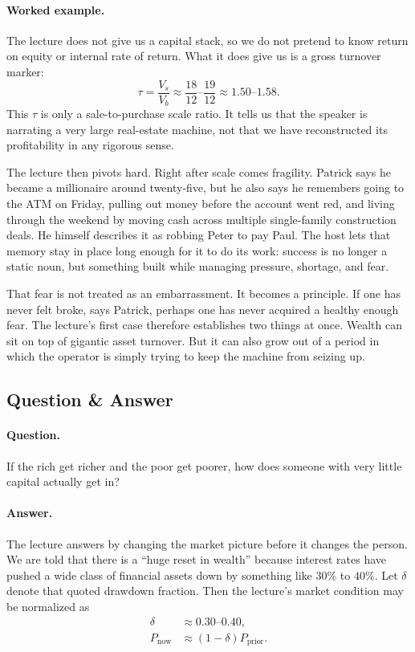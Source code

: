 \paragraph{Worked example.} The lecture does not give us a capital stack, so we do not pretend to know return on equity or internal rate of return. What it does give us is a gross turnover marker:
\begin{equation}
\tau = \frac{V_s}{V_b} \approx \frac{18}{12}\text{--}\frac{19}{12} \approx 1.50\text{--}1.58.
\end{equation}
This \(\tau\) is only a sale-to-purchase scale ratio. It tells us that the speaker is narrating a very large real-estate machine, not that we have reconstructed its profitability in any rigorous sense.

The lecture then pivots hard. Right after scale comes fragility. Patrick says he became a millionaire around twenty-five, but he also says he remembers going to the ATM on Friday, pulling out money before the account went red, and living through the weekend by moving cash across multiple single-family construction deals. He himself describes it as robbing Peter to pay Paul. The host lets that memory stay in place long enough for it to do its work: success is no longer a static noun, but something built while managing pressure, shortage, and fear.

That fear is not treated as an embarrassment. It becomes a principle. If one has never felt broke, says Patrick, perhaps one has never acquired a healthy enough fear. The lecture's first case therefore establishes two things at once. Wealth can sit on top of gigantic asset turnover. But it can also grow out of a period in which the operator is simply trying to keep the machine from seizing up.

\subsection{Question \& Answer}

\paragraph{Question.} If the rich get richer and the poor get poorer, how does someone with very little capital actually get in?

\paragraph{Answer.} The lecture answers by changing the market picture before it changes the person. We are told that there is a ``huge reset in wealth'' because interest rates have pushed a wide class of financial assets down by something like \(30\%\) to \(40\%\). Let \(\delta\) denote that quoted drawdown fraction. Then the lecture's market condition may be normalized as
\begin{align}
\delta &\approx 0.30\text{--}0.40,\\
P_{\mathrm{now}} &\approx (1-\delta)P_{\mathrm{prior}}.
\end{align}

